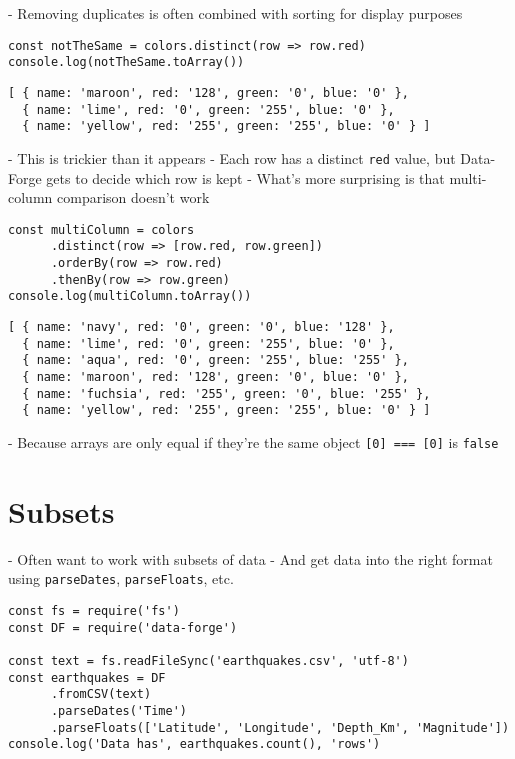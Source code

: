 
-   Removing duplicates is often combined with sorting for display purposes

\begin{verbatim}
const notTheSame = colors.distinct(row => row.red)
console.log(notTheSame.toArray())
\end{verbatim}

\begin{verbatim}
[ { name: 'maroon', red: '128', green: '0', blue: '0' },
  { name: 'lime', red: '0', green: '255', blue: '0' },
  { name: 'yellow', red: '255', green: '255', blue: '0' } ]
\end{verbatim}

-   This is trickier than it appears
    -   Each row has a distinct \texttt{red} value,
        but Data-Forge gets to decide which row is kept
-   What's more surprising is that multi-column comparison doesn't work

\begin{verbatim}
const multiColumn = colors
      .distinct(row => [row.red, row.green])
      .orderBy(row => row.red)
      .thenBy(row => row.green)
console.log(multiColumn.toArray())
\end{verbatim}

\begin{verbatim}
[ { name: 'navy', red: '0', green: '0', blue: '128' },
  { name: 'lime', red: '0', green: '255', blue: '0' },
  { name: 'aqua', red: '0', green: '255', blue: '255' },
  { name: 'maroon', red: '128', green: '0', blue: '0' },
  { name: 'fuchsia', red: '255', green: '0', blue: '255' },
  { name: 'yellow', red: '255', green: '255', blue: '0' } ]
\end{verbatim}

-   Because arrays are only equal if they're the same object
    \texttt{[0] === [0]} is \texttt{false}

\section{Subsets}\label{s:dataforge-subset}

-   Often want to work with subsets of data
    -   And get data into the right format using \texttt{parseDates}, \texttt{parseFloats}, etc.

\begin{verbatim}
const fs = require('fs')
const DF = require('data-forge')

const text = fs.readFileSync('earthquakes.csv', 'utf-8')
const earthquakes = DF
      .fromCSV(text)
      .parseDates('Time')
      .parseFloats(['Latitude', 'Longitude', 'Depth_Km', 'Magnitude'])
console.log('Data has', earthquakes.count(), 'rows')
\end{verbatim}

